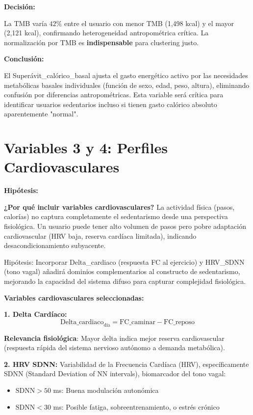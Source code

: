 \documentclass[12pt,letterpaper,twoside]{report}
\begin{document}
\begin{decisionbox}
\textbf{Decisión:}

La TMB varía $42\%$ entre el usuario con menor TMB (1,498 kcal) y el mayor (2,121 kcal), confirmando heterogeneidad antropométrica crítica. La normalización por TMB es \textbf{indispensable} para clustering justo.
\end{decisionbox}

\begin{conclusionbox}
\textbf{Conclusión:}

El Superávit\_calórico\_basal ajusta el gasto energético activo por las necesidades metabólicas basales individuales (función de sexo, edad, peso, altura), eliminando confusión por diferencias antropométricas. Esta variable será crítica para identificar usuarios sedentarios incluso si tienen gasto calórico absoluto aparentemente "normal".
\end{conclusionbox}

\section{Variables 3 y 4: Perfiles Cardiovasculares}

\begin{hipotesisbox}
\textbf{Hipótesis:}

\textbf{¿Por qué incluir variables cardiovasculares?} La actividad física (pasos, calorías) no captura completamente el sedentarismo desde una perspectiva fisiológica. Un usuario puede tener alto volumen de pasos pero pobre adaptación cardiovascular (HRV baja, reserva cardíaca limitada), indicando desacondicionamiento subyacente.

Hipótesis: Incorporar Delta\_cardiaco (respuesta FC al ejercicio) y HRV\_SDNN (tono vagal) añadirá dominios complementarios al constructo de sedentarismo, mejorando la capacidad del sistema difuso para capturar complejidad fisiológica.
\end{hipotesisbox}

\begin{estadisticobox}
\textbf{Variables cardiovasculares seleccionadas:}

\textbf{1. Delta Cardíaco:}
\begin{equation}
\text{Delta\_cardiaco}_{\text{día}} = \text{FC\_caminar} - \text{FC\_reposo}
\end{equation}

\textbf{Relevancia fisiológica}: Mayor delta indica mejor reserva cardiovascular (respuesta rápida del sistema nervioso autónomo a demanda metabólica).

\textbf{2. HRV SDNN:} Variabilidad de la Frecuencia Cardíaca (HRV), específicamente SDNN (Standard Deviation of NN intervals), biomarcador del tono vagal:
\begin{itemize}[noitemsep]
    \item $\text{SDNN} > 50$ ms: Buena modulación autonómica
    \item $\text{SDNN} < 30$ ms: Posible fatiga, sobreentrenamiento, o estrés crónico
\end{itemize}
\end{estadisticobox}
\end{document}
